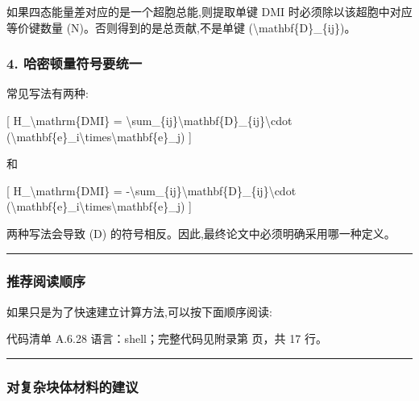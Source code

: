 \documentclass[lang=cn,scheme=chinese,color=blue,device=normal,toc=onecol,math=cm]{elegantbook}
\begin{document}
如果四态能量差对应的是一个超胞总能,则提取单键 DMI 时必须除以该超胞中对应等价键数量 (N)。否则得到的是总贡献,不是单键 (\textbackslash{}\allowbreak{}mathbf\{D\}\_\allowbreak{}\{ij\})。\par


\subsubsection{4. 哈密顿量符号要统一}


常见写法有两种:\par


[ H\_\allowbreak{}\textbackslash{}\allowbreak{}mathrm\{DMI\} = \textbackslash{}\allowbreak{}sum\_\allowbreak{}\{ij\}\textbackslash{}\allowbreak{}mathbf\{D\}\_\allowbreak{}\{ij\}\textbackslash{}\allowbreak{}cdot (\textbackslash{}\allowbreak{}mathbf\{e\}\_\allowbreak{}i\textbackslash{}\allowbreak{}times\textbackslash{}\allowbreak{}mathbf\{e\}\_\allowbreak{}j) ]\par


和\par


[ H\_\allowbreak{}\textbackslash{}\allowbreak{}mathrm\{DMI\} = -\textbackslash{}\allowbreak{}sum\_\allowbreak{}\{ij\}\textbackslash{}\allowbreak{}mathbf\{D\}\_\allowbreak{}\{ij\}\textbackslash{}\allowbreak{}cdot (\textbackslash{}\allowbreak{}mathbf\{e\}\_\allowbreak{}i\textbackslash{}\allowbreak{}times\textbackslash{}\allowbreak{}mathbf\{e\}\_\allowbreak{}j) ]\par


两种写法会导致 (D) 的符号相反。因此,最终论文中必须明确采用哪一种定义。\par


\medskip\hrule\medskip


\subsubsection{推荐阅读顺序}


如果只是为了快速建立计算方法,可以按下面顺序阅读:\par


\begin{codeindexbox}{代码清单 A.6.28}
语言：shell；完整代码见附录第 \pageref{code:6:28} 页，共 17 行。
\end{codeindexbox}


\medskip\hrule\medskip


\subsubsection{对复杂块体材料的建议}
\end{document}
